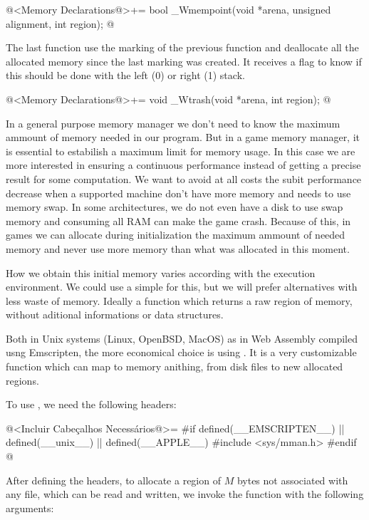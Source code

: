 \iniciocodigo
@<Memory Declarations@>+=
bool _Wmempoint(void *arena, unsigned alignment, int region);
@
\fimcodigo

The last function use the marking of the previous function and
deallocate all the allocated memory since the last marking was
created. It receives a flag to know if this should be done with the
left (0) or right (1) stack.

\iniciocodigo
@<Memory Declarations@>+=
void _Wtrash(void *arena, int region);
@
\fimcodigo



In a general purpose memory manager we don't need to know the maximum
ammount of memory needed in our program. But in a game memory manager,
it is essential to estabilish a maximum limit for memory usage. In
this case we are more interested in ensuring a continuous performance
instead of getting a precise result for some computation. We want to
avoid at all costs the subit performance decrease when a supported
machine don't have more memory and needs to use memory swap. In some
architectures, we do not even have a disk to use swap memory and
consuming all RAM can make the game crash. Because of this, in games
we can allocate during initialization the maximum ammount of needed
memory and never use more memory than what was allocated in this
moment.

How we obtain this initial memory varies according with the execution
environment. We could use a simple  for this, but
we will prefer alternatives with less waste of memory. Ideally a
function which returns a raw region of memory, without aditional
informations or data structures.

Both in Unix systems (Linux, OpenBSD, MacOS) as in Web Assembly
compiled usng Emscripten, the more economical choice is
using . It is a very customizable function which can
map to memory anithing, from disk files to new allocated regions.

To use  , we need the following headers:

\iniciocodigo
@<Incluir Cabeçalhos Necessários@>=
#if defined(__EMSCRIPTEN__) || defined(__unix__) || defined(__APPLE__)
#include <sys/mman.h>
#endif
@
\fimcodigo

After defining the headers, to allocate a region of $M$ bytes not
associated with any file, which can be read and written, we invoke the
function with the following arguments:

